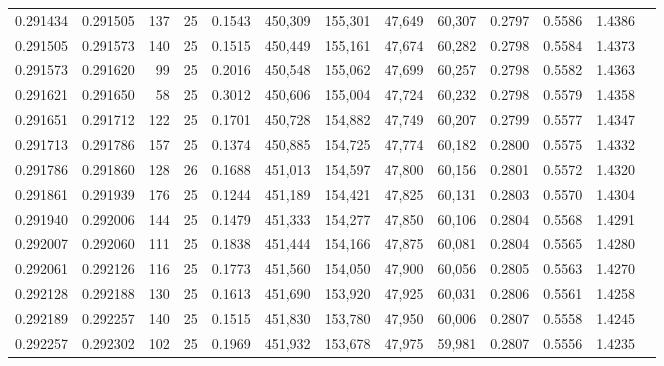 \begin{tabular}{rrrrrrrrrrrrr}
0.291434 & 0.291505 &   137 &  25 &                                     0.1543 & 450,309 & 155,301 &  47,649 &  60,307 & 0.2797 & 0.5586 & 1.4386 \\
0.291505 & 0.291573 &   140 &  25 &                                     0.1515 & 450,449 & 155,161 &  47,674 &  60,282 & 0.2798 & 0.5584 & 1.4373 \\
0.291573 & 0.291620 &    99 &  25 &                                     0.2016 & 450,548 & 155,062 &  47,699 &  60,257 & 0.2798 & 0.5582 & 1.4363 \\
0.291621 & 0.291650 &    58 &  25 &                                     0.3012 & 450,606 & 155,004 &  47,724 &  60,232 & 0.2798 & 0.5579 & 1.4358 \\
0.291651 & 0.291712 &   122 &  25 &                                     0.1701 & 450,728 & 154,882 &  47,749 &  60,207 & 0.2799 & 0.5577 & 1.4347 \\
0.291713 & 0.291786 &   157 &  25 &                                     0.1374 & 450,885 & 154,725 &  47,774 &  60,182 & 0.2800 & 0.5575 & 1.4332 \\
0.291786 & 0.291860 &   128 &  26 &                                     0.1688 & 451,013 & 154,597 &  47,800 &  60,156 & 0.2801 & 0.5572 & 1.4320 \\
0.291861 & 0.291939 &   176 &  25 &                                     0.1244 & 451,189 & 154,421 &  47,825 &  60,131 & 0.2803 & 0.5570 & 1.4304 \\
0.291940 & 0.292006 &   144 &  25 &                                     0.1479 & 451,333 & 154,277 &  47,850 &  60,106 & 0.2804 & 0.5568 & 1.4291 \\
0.292007 & 0.292060 &   111 &  25 &                                     0.1838 & 451,444 & 154,166 &  47,875 &  60,081 & 0.2804 & 0.5565 & 1.4280 \\
0.292061 & 0.292126 &   116 &  25 &                                     0.1773 & 451,560 & 154,050 &  47,900 &  60,056 & 0.2805 & 0.5563 & 1.4270 \\
0.292128 & 0.292188 &   130 &  25 &                                     0.1613 & 451,690 & 153,920 &  47,925 &  60,031 & 0.2806 & 0.5561 & 1.4258 \\
0.292189 & 0.292257 &   140 &  25 &                                     0.1515 & 451,830 & 153,780 &  47,950 &  60,006 & 0.2807 & 0.5558 & 1.4245 \\
0.292257 & 0.292302 &   102 &  25 &                                     0.1969 & 451,932 & 153,678 &  47,975 &  59,981 & 0.2807 & 0.5556 & 1.4235 \\

\end{tabular}
